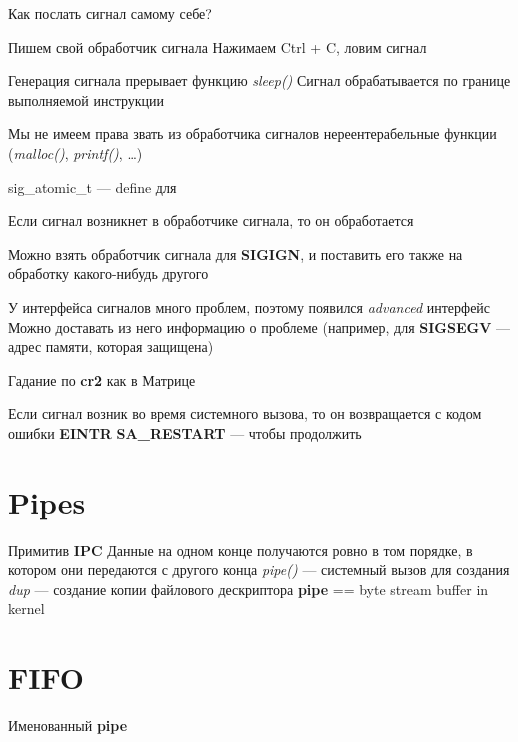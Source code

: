 Как послать сигнал самому себе?

Пишем свой обработчик сигнала
Нажимаем Ctrl + C, ловим сигнал

Генерация сигнала прерывает функцию \emph{sleep()}
Сигнал обрабатывается по границе выполняемой инструкции

Мы не имеем права звать из обработчика сигналов нереентерабельные функции (\emph{malloc()}, \emph{printf()}, \dots)

sig_atomic_t --- define для 

Если сигнал возникнет в обработчике сигнала, то он обработается

Можно взять обработчик сигнала для \textbf{SIGIGN}, и поставить его также на обработку какого-нибудь другого

У интерфейса сигналов много проблем, поэтому появился \emph{advanced} интерфейс 
Можно доставать из него информацию о проблеме (например, для \textbf{SIGSEGV} --- адрес памяти, которая защищена)

Гадание по \textbf{cr2} как в Матрице




Если сигнал возник во время системного вызова, то он возвращается с кодом ошибки \textbf{EINTR}
\textbf{SA_RESTART} --- чтобы продолжить


\section{Pipes}
Примитив \textbf{IPC}
Данные на одном конце получаются ровно в том порядке, в котором они передаются с другого конца
\emph{pipe()} --- системный вызов для создания
\emph{dup} --- создание копии файлового дескриптора
\textbf{pipe} == byte stream buffer in kernel

\section{FIFO}
Именованный \textbf{pipe}
